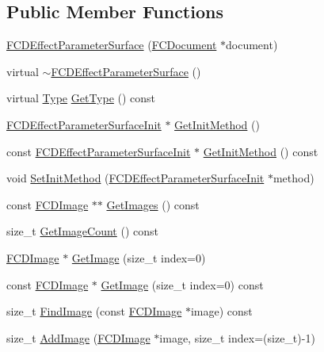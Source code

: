 \subsection*{Public Member Functions}
\begin{DoxyCompactItemize}
\item 
\hyperlink{classFCDEffectParameterSurface_a365475eff0f265c84c0b749b9d6e6e0d}{FCDEffectParameterSurface} (\hyperlink{classFCDocument}{FCDocument} $\ast$document)
\item 
virtual \hyperlink{classFCDEffectParameterSurface_aef09401c63f2c3fbfcacca78064d5c4d}{$\sim$FCDEffectParameterSurface} ()
\item 
virtual \hyperlink{classFCDEffectParameter_a1efe74553d2ed199435085c171743b08}{Type} \hyperlink{classFCDEffectParameterSurface_a48e1ec0933996bc9ebb5ef1ec9b8e334}{GetType} () const 
\item 
\hyperlink{classFCDEffectParameterSurfaceInit}{FCDEffectParameterSurfaceInit} $\ast$ \hyperlink{classFCDEffectParameterSurface_a1b399c2a8fbf1444d3978017f8abee01}{GetInitMethod} ()
\item 
const \hyperlink{classFCDEffectParameterSurfaceInit}{FCDEffectParameterSurfaceInit} $\ast$ \hyperlink{classFCDEffectParameterSurface_a6450a67e0c01706ff96363d2e86ee6f0}{GetInitMethod} () const 
\item 
void \hyperlink{classFCDEffectParameterSurface_aeabfcc4c49e58c2838442a7812d8089e}{SetInitMethod} (\hyperlink{classFCDEffectParameterSurfaceInit}{FCDEffectParameterSurfaceInit} $\ast$method)
\item 
const \hyperlink{classFCDImage}{FCDImage} $\ast$$\ast$ \hyperlink{classFCDEffectParameterSurface_ab16a2edc1ecb7a54f622f890c6cda395}{GetImages} () const 
\item 
size\_\-t \hyperlink{classFCDEffectParameterSurface_a443aec0a023b31f27ffd8e1d182774fe}{GetImageCount} () const 
\item 
\hyperlink{classFCDImage}{FCDImage} $\ast$ \hyperlink{classFCDEffectParameterSurface_af4276ec08cfb3d4221ce194e853e035a}{GetImage} (size\_\-t index=0)
\item 
const \hyperlink{classFCDImage}{FCDImage} $\ast$ \hyperlink{classFCDEffectParameterSurface_a5d1101a0718e31566ee4aba117a09df7}{GetImage} (size\_\-t index=0) const 
\item 
size\_\-t \hyperlink{classFCDEffectParameterSurface_a18ad28d3f7f968be42d64a3dcbdca6e4}{FindImage} (const \hyperlink{classFCDImage}{FCDImage} $\ast$image) const 
\item 
size\_\-t \hyperlink{classFCDEffectParameterSurface_a49b5474ba6ef9fe0682046e7a3309440}{AddImage} (\hyperlink{classFCDImage}{FCDImage} $\ast$image, size\_\-t index=(size\_\-t)-\/1)
$$
\end{DoxyCompactItemize}
